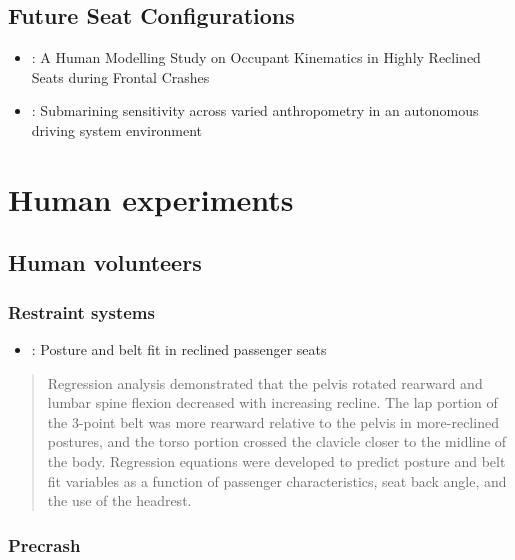 \documentclass[]{book}
\providecommand{\tightlist}{%
  \setlength{\itemsep}{0pt}\setlength{\parskip}{0pt}}
\begin{document}
\hypertarget{future-seat-configurations}{%
\section{Future Seat Configurations}\label{future-seat-configurations}}

\begin{itemize}
\item
  \citet{Boyle2019}: A Human Modelling Study on Occupant Kinematics in Highly Reclined Seats during Frontal Crashes
\item
  \citet{Rawska2019}: Submarining sensitivity across varied anthropometry in an autonomous driving system environment
\end{itemize}

\hypertarget{human-experiments}{%
\chapter{Human experiments}\label{human-experiments}}

\hypertarget{human-volunteers}{%
\section{Human volunteers}\label{human-volunteers}}

\hypertarget{restraint-systems}{%
\subsection{Restraint systems}\label{restraint-systems}}

\begin{itemize}
\tightlist
\item
  \citep{Reed2019} : Posture and belt fit in reclined passenger seats
\end{itemize}

\begin{quote}
Regression analysis demonstrated that the pelvis rotated rearward and lumbar spine flexion decreased with increasing recline. The lap portion of the 3-point belt was more rearward relative to the pelvis in more-reclined postures, and the torso portion crossed the clavicle closer to the midline of the body. Regression equations were developed to predict posture and belt fit variables as a function of passenger characteristics, seat back angle, and the use of the headrest.
\end{quote}

\hypertarget{precrash}{%
\subsection{Precrash}\label{precrash}}
\end{document}
